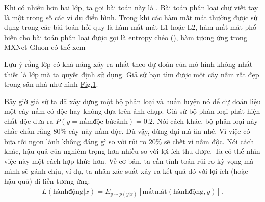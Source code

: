 \documentclass[letterpaper,11pt,english]{sphinxmanual}
\let\sphinxpxdimen\pdfpxdimen\else\newdimen\sphinxpxdimen
\begin{document}
Khi có nhiều hơn hai lớp, ta gọi bài toán này là . Bài
toán phân loại chữ viết tay \sphinxcode{\sphinxupquote{{[}0, 1, 2, 3 ... 9, a, b, c, ...{]}}} là một
trong số các ví dụ điển hình. Trong khi các hàm mất mát thường được sử
dụng trong các bài toán hồi quy là hàm mất mát L1 hoặc L2, hàm mất mát
phổ biến cho bài toán phân loại được gọi là entropy chéo
(), hàm tương ứng trong MXNet Gluon có thể xem %
\begin{footnote}[32]\sphinxAtStartFootnote
{}
%
\end{footnote}







Lưu ý rằng lớp có khả năng xảy ra nhất theo dự đoán của mô hình không
nhất thiết là lớp mà ta quyết định sử dụng. Giả sử bạn tìm được một cây
nấm rất đẹp trong sân nhà như hình \hyperref[\detokenize{chapter_introduction/index_vn:fig-death-cap}]{Fig.\@ \ref{\detokenize{chapter_introduction/index_vn:fig-death-cap}}}.



\begin{figure}[H]
\centering
\capstart

\noindent\sphinxincludegraphics[width=200\sphinxpxdimen]{{death_cap}.jpg}
\caption{}\label{\detokenize{chapter_introduction/index_vn:id12}}\label{\detokenize{chapter_introduction/index_vn:fig-death-cap}}\end{figure}



Bây giờ giả sử ta đã xây dựng một bộ phân loại và huấn luyện nó để dự
đoán liệu một cây nấm có độc hay không dựa trên ảnh chụp. Giả sử bộ phân
loại phát hiện chất độc đưa ra
\(P(y=\mathrm{nấm độc}|\mathrm{bức ảnh}) = 0.2\). Nói cách khác, bộ
phân loại này chắc chắn rằng \(80\%\) cây này  nấm độc.
Dù vậy, đừng dại mà ăn nhé. Vì việc có bữa tối ngon lành không đáng gì
so với rủi ro \(20\%\) sẽ chết vì nấm độc. Nói cách khác, hậu quả
của  nghiêm trọng hơn nhiều so với lợi ích thu
được. Ta có thể nhìn việc này một cách hợp thức hơn. Về cơ bản, ta cần
tính toán rủi ro kỳ vọng mà mình sẽ gánh chịu, ví dụ, ta nhân xác suất
xảy ra kết quả đó với lợi ích (hoặc hậu quả) đi liền tương ứng:
\begin{equation}\label{equation:chapter_introduction/index_vn:chapter_introduction/index_vn:2}
\begin{split}L(\mathrm{hành động}| x) = E_{y \sim p(y| x)}[\mathrm{mất mát}(\mathrm{hành động},y)].\end{split}
\end{equation}
\end{document}

